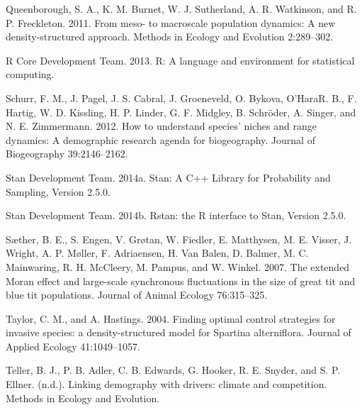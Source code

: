 \documentclass[12pt,]{article}
\begin{document}
Queenborough, S. A., K. M. Burnet, W. J. Sutherland, A. R. Watkinson,
and R. P. Freckleton. 2011. From meso- to macroscale population
dynamics: A new density-structured approach. Methods in Ecology and
Evolution 2:289--302.

R Core Development Team. 2013. R: A language and environment for
statistical computing.

Schurr, F. M., J. Pagel, J. S. Cabral, J. Groeneveld, O. Bykova,
O'HaraR. B., F. Hartig, W. D. Kissling, H. P. Linder, G. F. Midgley, B.
Schröder, A. Singer, and N. E. Zimmermann. 2012. How to understand
species' niches and range dynamics: A demographic research agenda for
biogeography. Journal of Biogeography 39:2146--2162.

Stan Development Team. 2014a. Stan: A C++ Library for Probability and
Sampling, Version 2.5.0.

Stan Development Team. 2014b. Rstan: the R interface to Stan, Version
2.5.0.

Sæther, B. E., S. Engen, V. Grøtan, W. Fiedler, E. Matthysen, M. E.
Visser, J. Wright, A. P. Møller, F. Adriaensen, H. {Van Balen}, D.
Balmer, M. C. Mainwaring, R. H. McCleery, M. Pampus, and W. Winkel.
2007. The extended Moran effect and large-scale synchronous fluctuations
in the size of great tit and blue tit populations. Journal of Animal
Ecology 76:315--325.

Taylor, C. M., and A. Hastings. 2004. Finding optimal control strategies
for invasive species: a density-structured model for Spartina
alterniflora. Journal of Applied Ecology 41:1049--1057.

Teller, B. J., P. B. Adler, C. B. Edwards, G. Hooker, R. E. Snyder, and
S. P. Ellner. (n.d.). Linking demography with drivers: climate and
competition. Methods in Ecology and Evolution.
\end{document}

